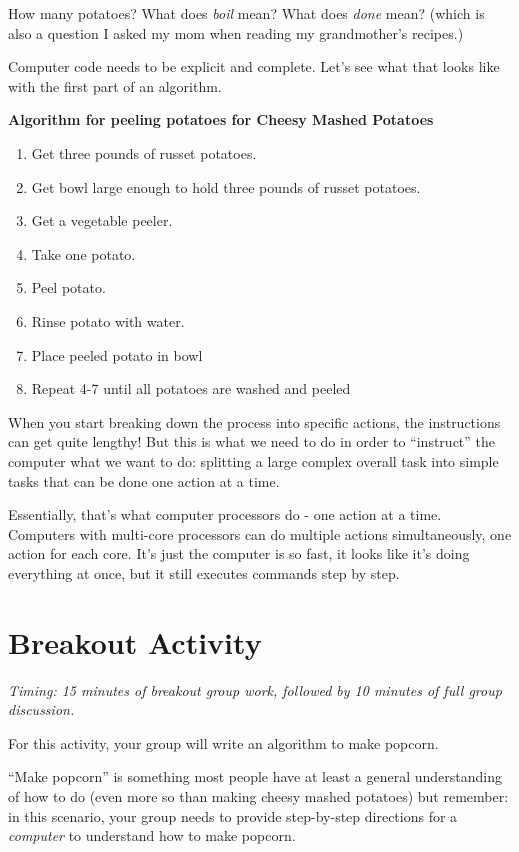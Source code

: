 \documentclass[
]{book}
\providecommand{\tightlist}{%
  \setlength{\itemsep}{0pt}\setlength{\parskip}{0pt}}
\begin{document}
How many potatoes? What does \emph{boil} mean? What does \emph{done} mean? (which is also a question I asked my mom when reading my grandmother's recipes.)

Computer code needs to be explicit and complete. Let's see what that looks like with the first part of an algorithm.

\textbf{Algorithm for peeling potatoes for Cheesy Mashed Potatoes}

\begin{enumerate}
\def\labelenumi{\arabic{enumi}.}
\tightlist
\item
  Get three pounds of russet potatoes.
\item
  Get bowl large enough to hold three pounds of russet potatoes.
\item
  Get a vegetable peeler.
\item
  Take one potato.
\item
  Peel potato.
\item
  Rinse potato with water.
\item
  Place peeled potato in bowl
\item
  Repeat 4-7 until all potatoes are washed and peeled
\end{enumerate}

When you start breaking down the process into specific actions, the instructions can get quite lengthy! But this is what we need to do in order to ``instruct'' the computer what we want to do: splitting a large complex overall task into simple tasks that can be done one action at a time.

Essentially, that's what computer processors do - one action at a time. Computers with multi-core processors can do multiple actions simultaneously, one action for each core. It's just the computer is so fast, it looks like it's doing everything at once, but it still executes commands step by step.

\section{Breakout Activity}\label{breakout-activity}

\emph{Timing: 15 minutes of breakout group work, followed by 10 minutes of full group discussion.}

For this activity, your group will write an algorithm to make popcorn.~

``Make popcorn'' is something most people have at least a general understanding of how to do (even more so than making cheesy mashed potatoes) but remember: in this scenario, your group needs to provide step-by-step directions for a \emph{computer} to understand how to make popcorn.
\end{document}
